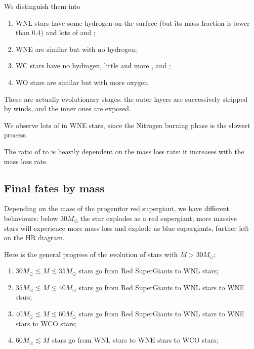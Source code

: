 \documentclass[main.tex]{subfiles}
\begin{document}
We distinguish them into 
\begin{enumerate}
    \item WNL stars have some hydrogen on the surface (but its mass fraction is lower than \num{.4}) and lots of  and ;
    \item WNE are similar but with no hydrogen;
    \item WC stars have no hydrogen, little  and more ,  and ;
    \item WO stars are similar but with more oxygen.
\end{enumerate}

These are actually evolutionary stages: the outer layers are successively stripped by winds, and the inner ones are exposed.

We observe lots of  in WNE stars, since the Nitrogen burning phase is the slowest process. 

The ratio of  to  is heavily dependent on the mass loss rate: it increases with the mass loss rate.


\subsection{Final fates by mass}

Depending on the mass of the progenitor red supergiant, we have different behaviours: below \(30 M_{\odot} \) the star explodes as a red supergiant; more massive stars will experience more mass loss and explode as blue supergiants, further left on the HR diagram. 

Here is the general progress of the evolution of stars with \(M > 30 M_{\odot}\):
\begin{enumerate}
  \item \(30 M_{\odot} \lesssim M \lesssim 35 M_{\odot}\) stars go from Red SuperGiants to WNL stars;
  \item \(35 M_{\odot} \lesssim M \lesssim 40 M_{\odot}\) stars go from Red SuperGiants to WNL stars to WNE stars;
  \item \(40 M_{\odot} \lesssim M \lesssim 60 M_{\odot}\) stars go from Red SuperGiants to WNL stars to WNE stars to WCO stars;
  \item \(60 M_{\odot} \lesssim M \) stars go from WNL stars to WNE stars to WCO stars;
\end{enumerate}
\end{document}

